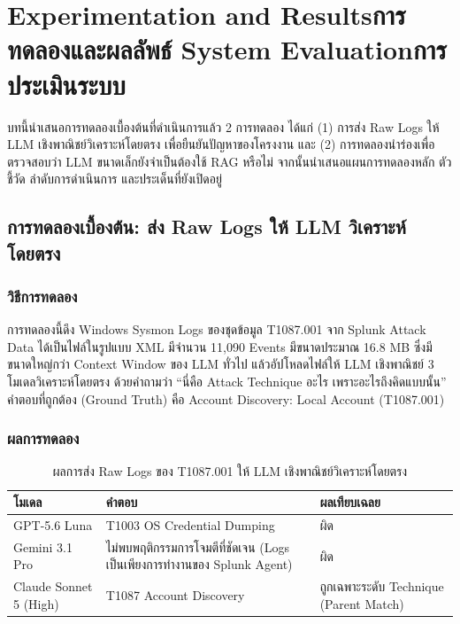 \chapter{\ifproject%
\ifenglish Experimentation and Results\else การทดลองและผลลัพธ์\fi
\else%
\ifenglish System Evaluation\else การประเมินระบบ\fi
\fi}

บทนี้นำเสนอการทดลองเบื้องต้นที่ดำเนินการแล้ว 2 การทดลอง ได้แก่
(1) การส่ง Raw Logs ให้ LLM เชิงพาณิชย์วิเคราะห์โดยตรง เพื่อยืนยันปัญหาของโครงงาน และ
(2) การทดลองนำร่องเพื่อตรวจสอบว่า LLM ขนาดเล็กยังจำเป็นต้องใช้ RAG หรือไม่
จากนั้นนำเสนอแผนการทดลองหลัก ตัวชี้วัด ลำดับการดำเนินการ และประเด็นที่ยังเปิดอยู่

\section{การทดลองเบื้องต้น: ส่ง Raw Logs ให้ LLM วิเคราะห์โดยตรง}

\subsection{วิธีการทดลอง}
การทดลองนี้ดึง Windows Sysmon Logs ของชุดข้อมูล T1087.001 จาก Splunk Attack Data
ได้เป็นไฟล์ในรูปแบบ XML มีจำนวน 11,090 Events มีขนาดประมาณ 16.8 MB
ซึ่งมีขนาดใหญ่กว่า Context Window ของ LLM ทั่วไป
แล้วอัปโหลดไฟล์ให้ LLM เชิงพาณิชย์ 3 โมเดลวิเคราะห์โดยตรง
ด้วยคำถามว่า ``นี่คือ Attack Technique อะไร เพราะอะไรถึงคิดแบบนั้น''
คำตอบที่ถูกต้อง (Ground Truth) คือ Account Discovery: Local Account (T1087.001)

\subsection{ผลการทดลอง}
\begin{table}[ht]
  \centering
  \caption{ผลการส่ง Raw Logs ของ T1087.001 ให้ LLM เชิงพาณิชย์วิเคราะห์โดยตรง}
  \label{tab:raw-llm}
  \begin{tabular}{|L{0.25\textwidth}|L{0.45\textwidth}|L{0.17\textwidth}|}
    \hline
    \textbf{โมเดล} & \textbf{คำตอบ} & \textbf{ผลเทียบเฉลย} \\ \hline
    GPT-5.6 Luna      & T1003 OS Credential Dumping & ผิด \\ \hline
    Gemini 3.1 Pro    & ไม่พบพฤติกรรมการโจมตีที่ชัดเจน (Logs เป็นเพียงการทำงานของ Splunk Agent) & ผิด \\ \hline
    Claude Sonnet 5 (High) & T1087 Account Discovery & ถูกเฉพาะระดับ Technique (Parent Match) \\ \hline
  \end{tabular}
\end{table}

